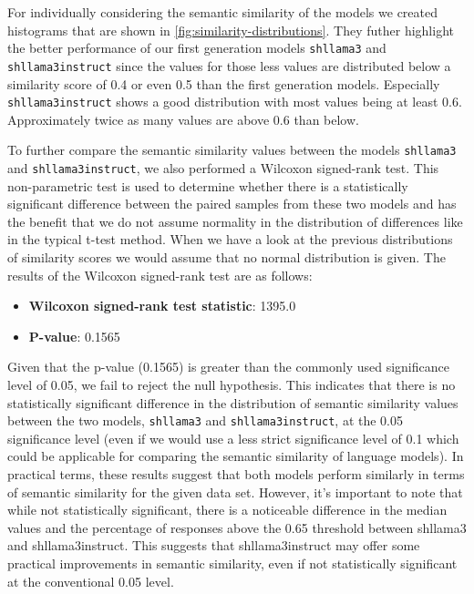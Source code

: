 For individually considering the semantic similarity of the models we created histograms that are shown in \cref{fig:similarity-distributions}. They futher highlight the better performance of our first generation models \texttt{shllama3} and \texttt{shllama3instruct} since the values for those less values are distributed below a similarity score of 0.4 or even 0.5 than the first generation models.
Especially \texttt{shllama3instruct} shows a good distribution with most values being at least 0.6. Approximately twice as many values are above 0.6 than below.

To further compare the semantic similarity values between the models \texttt{shllama3} and \texttt{shllama3instruct}, we also performed a Wilcoxon signed-rank test. This non-parametric test is used to determine whether there is a statistically significant difference between the paired samples from these two models and has the benefit that we do not assume normality in the distribution of differences like in the typical t-test method. When we have a look at the previous distributions of similarity scores we would assume that no normal distribution is given.
The results of the Wilcoxon signed-rank test are as follows:
\begin{itemize}
    \item \textbf{Wilcoxon signed-rank test statistic}: 1395.0
    \item \textbf{P-value}: 0.1565
\end{itemize}
Given that the p-value (0.1565) is greater than the commonly used significance level of 0.05, we fail to reject the null hypothesis. This indicates that there is no statistically significant difference in the distribution of semantic similarity values between the two models, \texttt{shllama3} and \texttt{shllama3instruct}, at the 0.05 significance level (even if we would use a less strict significance level of 0.1 which could be applicable for comparing the semantic similarity of language models).
In practical terms, these results suggest that both models perform similarly in terms of semantic similarity for the given data set.
However, it's important to note that while not statistically significant, there is a noticeable difference in the median values and the percentage of responses above the 0.65 threshold between shllama3 and shllama3instruct. This suggests that shllama3instruct may offer some practical improvements in semantic similarity, even if not statistically significant at the conventional 0.05 level.

